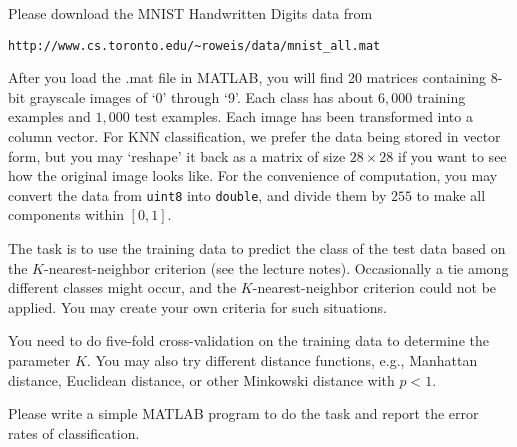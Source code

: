 \documentclass[12pt,twoside]{article}
\begin{document}
\begin{enumerate}
Please download the MNIST Handwritten Digits data from 
\begin{verbatim}
http://www.cs.toronto.edu/~roweis/data/mnist_all.mat
\end{verbatim}
After you load the .mat file in MATLAB, you will find 20 matrices containing 8-bit grayscale images of `0' through `9'. Each class has about $6,000$ training examples and $1,000$ test examples. Each image has been transformed into a column vector. For KNN classification, we prefer the data being stored in vector form, but you may `reshape' it back as a matrix of size $28\times 28$ if you want to see how the original image looks like. 
For the convenience of computation, you may convert the data from {\tt uint8} into {\tt double}, and divide them by $255$ to make all components within $[0, 1]$.

The task is to use the training data to predict the class of the test data based on the $K$-nearest-neighbor criterion (see the lecture notes). Occasionally a tie among different classes might occur, and the $K$-nearest-neighbor criterion could not be applied. You may create your own criteria for such situations.

You need to do five-fold cross-validation on the training data to determine the parameter $K$.
You may also try different distance functions, e.g., Manhattan distance, Euclidean distance, or other
Minkowski distance with $p < 1$.

Please write a simple MATLAB program to do the task and report the error rates of classification.

\end{enumerate}
\end{document}
